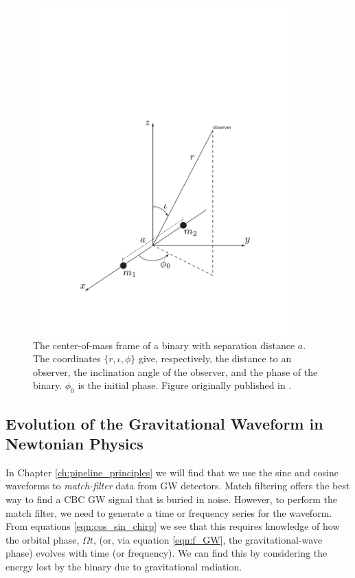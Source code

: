 \begin{figure}
\center
\includegraphics[height=5in]{figures/binary.pdf}
\caption{The center-of-mass frame of a binary with separation distance $a$. The coordinates $\{r,\iota,\phi\}$ give, respectively, the distance to an observer, the inclination angle of the observer, and the phase of the binary. $\phi_0$ is the initial phase. Figure originally published in \cite{ref:Brown}.}
\label{fig:binary_coords}
\end{figure}


\subsection{Evolution of the Gravitational Waveform in Newtonian Physics}
\label{sec:0pn_solution}

In Chapter \ref{ch:pipeline_principles} we will find that we use the sine and cosine waveforms to \emph{match-filter} data from \ac{GW} detectors. Match filtering offers the best way to find a \ac{CBC} \ac{GW} signal that is buried in noise. However, to perform the match filter, we need to generate a time or frequency series for the waveform. From equations \ref{eqn:cos_sin_chirp} we see that this requires knowledge of how the orbital phase, $\Omega t$, (or, via equation \ref{eqn:f_GW}, the gravitational-wave phase) evolves with time (or frequency). We can find this by considering the energy lost by the binary due to gravitational radiation.


